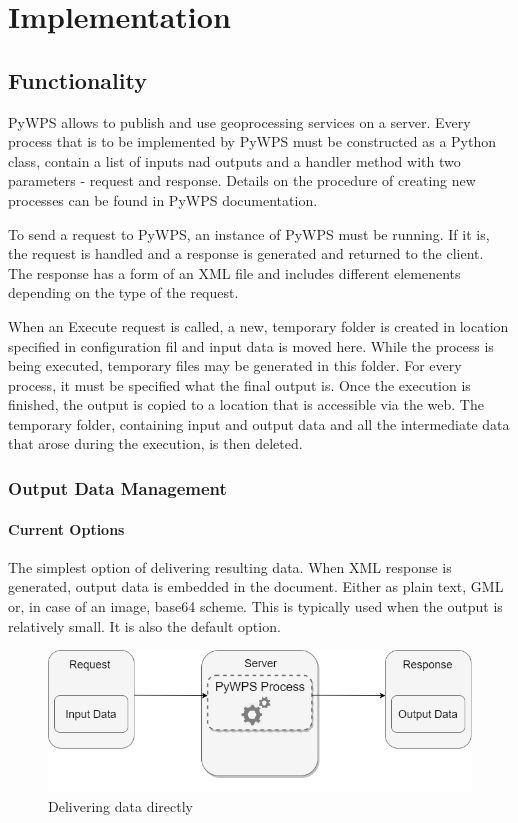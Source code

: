 \chapter{Implementation}
\label{4-practical}

\section{Functionality} 

PyWPS allows to publish and use geoprocessing services on a server. Every process that is to be implemented by PyWPS must be constructed as a Python class, contain a list of inputs nad outputs and a handler method with two parameters - request and response. Details on the procedure of creating new processes can be found in PyWPS documentation.\cite{pywpsprocess} 

To send a request to PyWPS, an instance of PyWPS must be running. If it is, the request is handled and a response is generated and returned to the client. The response has a form of an XML file and includes different elemenents depending on the type of the request.

When an Execute request is called, a new, temporary folder is created in location specified in configuration fil and input data is moved here. While the process is being executed, temporary files may be generated in this folder. For every process, it must be specified what the final output is. Once the execution is finished, the output is copied to a location that is accessible via the web. The temporary folder, containing input and output data and all the intermediate data that arose during the execution, is then deleted.

\subsection{Output Data Management}


\subsubsection{Current Options} 

The simplest option of delivering resulting data. When XML response is generated, output data is embedded in the document. Either as plain text, GML or, in case of an image, base64 scheme. This is typically used when the output is relatively small. It is also the default option.

\begin{figure}[H] \centering
      \includegraphics[width=350pt]{./pictures/optionone.png}
      \caption[Delivering data directly]{Delivering data directly}
      \label{fig:optionone}
  \end{figure}

